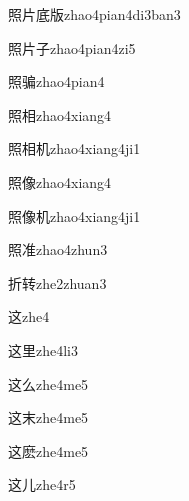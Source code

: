 \begin{verbete}[13;4;8;8]{照片底版}{zhao4pian4di3ban3}
\end{verbete}
\begin{verbete}[13;4;3]{照片子}{zhao4pian4zi5}
\end{verbete}
\begin{verbete}[13;12]{照骗}{zhao4pian4}
\end{verbete}
\begin{verbete}[13;9]{照相}{zhao4xiang4}
\end{verbete}
\begin{verbete}[13;9;6]{照相机}{zhao4xiang4ji1}
\end{verbete}
\begin{verbete}[13;13]{照像}{zhao4xiang4}
\end{verbete}
\begin{verbete}[13;13;6]{照像机}{zhao4xiang4ji1}
\end{verbete}
\begin{verbete}[13;10]{照准}{zhao4zhun3}
\end{verbete}
\begin{verbete}[7;8]{折转}{zhe2zhuan3}
\end{verbete}
\begin{verbete}[7]{这}{zhe4}
\end{verbete}
\begin{verbete}[7;7]{这里}{zhe4li3}
\end{verbete}
\begin{verbete}[7;3]{这么}{zhe4me5}
\end{verbete}
\begin{verbete}[7;5]{这末}{zhe4me5}
\end{verbete}
\begin{verbete}[7;14]{这麽}{zhe4me5}
\end{verbete}
\begin{verbete}[7;2]{这儿}{zhe4r5}
\end{verbete}
